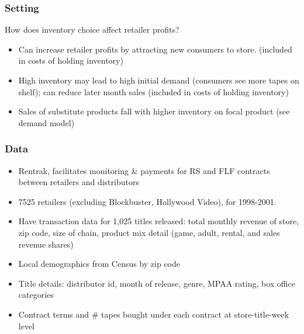 
\begin{frame}
\frametitle{Setting}

How does inventory choice affect retailer profits?

\begin{itemize}
\item Can increase retailer profits by attracting new consumers to store.
(included in costs of holding inventory)

\item High inventory may lead to high initial demand (consumers see more
tapes on shelf); can reduce later month sales (included in costs of holding
inventory)

\item Sales of substitute products fall with higher inventory on focal
product (see demand model)
\end{itemize}
\end{frame}


\begin{frame}
\frametitle{Data}

\begin{itemize}
\item Rentrak, facilitates monitoring \& payments for RS and FLF contracts
between retailers and distributors

\item 7525 retailers (excluding Blockbuster, Hollywood Video), for 1998-2001.

\item Have transaction data for 1,025 titles released: total monthly revenue
of store, zip code, size of chain, product mix detail (game, adult, rental,
and sales revenue shares)

\item Local demographics from Census by zip code

\item Title details: distributor id, month of release, genre, MPAA rating,
box office categories

\item Contract terms and \# tapes bought under each contract at
store-title-week level
\end{itemize}
\end{frame}


